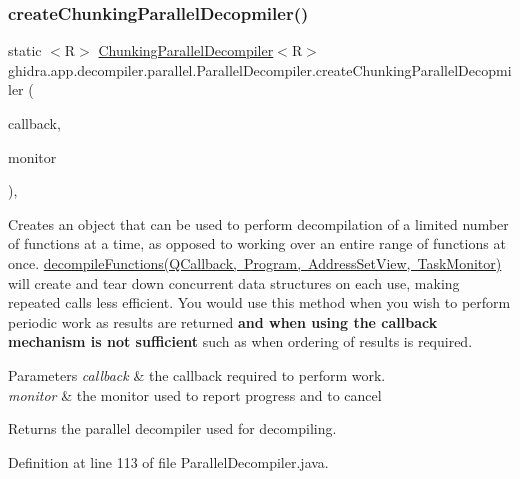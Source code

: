 \subsubsection{\texorpdfstring{createChunkingParallelDecopmiler()}{createChunkingParallelDecopmiler()}}
{\footnotesize\ttfamily static $<$R$>$ \mbox{\hyperlink{classghidra_1_1app_1_1decompiler_1_1parallel_1_1_chunking_parallel_decompiler}{Chunking\+Parallel\+Decompiler}}$<$R$>$ ghidra.\+app.\+decompiler.\+parallel.\+Parallel\+Decompiler.\+create\+Chunking\+Parallel\+Decopmiler (\begin{DoxyParamCaption}\item[{Q\+Callback$<$ Function, R $>$}]{callback,  }\item[{Task\+Monitor}]{monitor }\end{DoxyParamCaption})\hspace{0.3cm}{\ttfamily [inline]}, {\ttfamily [static]}}

Creates an object that can be used to perform decompilation of a limited number of functions at a time, as opposed to working over an entire range of functions at once. \mbox{\hyperlink{}{decompile\+Functions(\+Q\+Callback, Program, Address\+Set\+View, Task\+Monitor)}} will create and tear down concurrent data structures on each use, making repeated calls less efficient. You would use this method when you wish to perform periodic work as results are returned {\bfseries{and when using the callback mechanism is not sufficient}} such as when ordering of results is required.


\begin{DoxyParams}{Parameters}
{\em callback} & the callback required to perform work. \\
\hline
{\em monitor} & the monitor used to report progress and to cancel \\
\hline
\end{DoxyParams}
\begin{DoxyReturn}{Returns}
the parallel decompiler used for decompiling. 
\end{DoxyReturn}


Definition at line 113 of file Parallel\+Decompiler.\+java.

